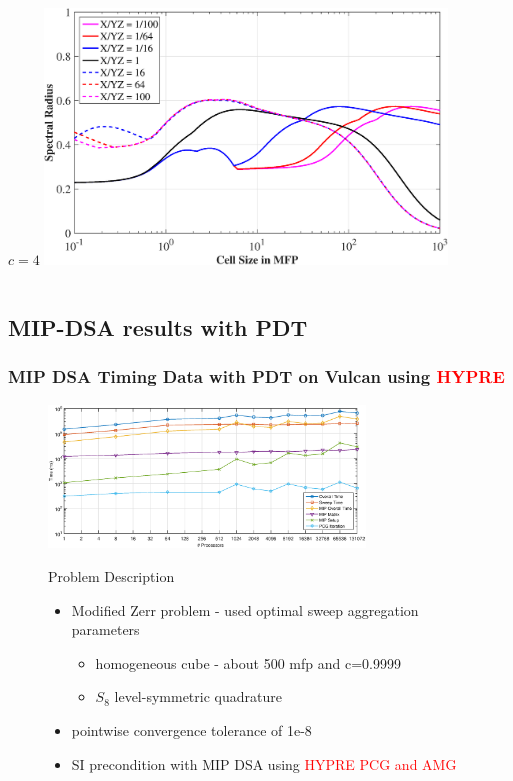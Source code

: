 \documentclass[compress,10pt]{beamer}
\newcommand{\tcr}[1]{\textcolor{red}{#1}}
\begin{document}
\begin{frame}[t]
\begin{columns}
\begin{block}{$c=4$}
{}\includegraphics[width=0.8\textwidth]{images/SI_MIP_hex_LS8_C=4_AR.eps}
\end{block}
\end{columns}
\end{frame}
\subsection{MIP-DSA results with PDT}

\begin{frame}[t]\frametitle{MIP DSA Timing Data with PDT on Vulcan using \tcr{HYPRE}}
\begin{figure}[t]
\centering
{}\includegraphics[width=0.75\textwidth]{images/Vulcan_DSA_Timing.eps}
\begin{block}{Problem Description}
	\begin{itemize}
	\item Modified Zerr problem - used optimal sweep aggregation parameters
	\begin{itemize}
	\item homogeneous cube - about 500 mfp and c=0.9999
	\item $S_8$ level-symmetric quadrature
	\end{itemize}
	\item pointwise convergence tolerance of 1e-8
	\item SI precondition with MIP DSA using \tcr{HYPRE PCG and AMG}
	\end{itemize}
\end{block}
\end{figure}
\end{frame}
\end{document}
